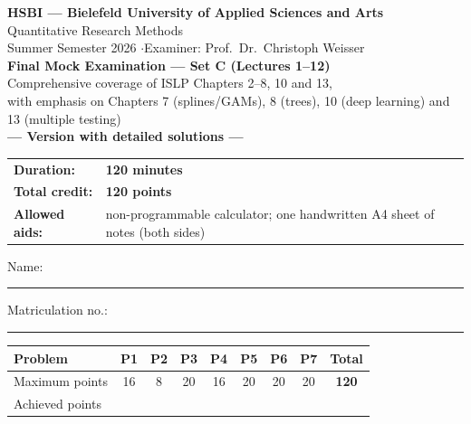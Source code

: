 \documentclass[11pt,a4paper]{article}
\begin{document}
\begin{center}
  {\Large\textbf{HSBI --- Bielefeld University of Applied Sciences and Arts}}\\[1.2mm]
  {\large Quantitative Research Methods}\\[1mm]
  {\normalsize Summer Semester 2026 \quad$\cdot$\quad Examiner: Prof.\ Dr.\ Christoph Weisser}\\[4.5mm]
  {\LARGE\textbf{Final Mock Examination --- Set C (Lectures 1--12)}}\\[1.2mm]
  {\normalsize Comprehensive coverage of ISLP Chapters 2--8, 10 and 13,\\
   with emphasis on Chapters 7 (splines/GAMs), 8 (trees), 10 (deep learning) and 13 (multiple testing)}%
  \ifdefined\withsolutions\\[2.2mm]{\large\textcolor{teal!55!black}{\textbf{--- Version with detailed solutions ---}}}\fi
\end{center}

\vspace{2.5mm}
\begin{center}
\begin{tabular}{@{}ll@{}}
  \textbf{Duration:} & \textbf{120 minutes}\\
  \textbf{Total credit:} & \textbf{120 points}\\
  \textbf{Allowed aids:} & non-programmable calculator; one handwritten A4 sheet of notes (both sides)\\
\end{tabular}
\end{center}

\vspace{3mm}
Name: \rule[-1mm]{0.38\textwidth}{0.4pt}\hfill Matriculation no.: \rule[-1mm]{0.24\textwidth}{0.4pt}

\vspace{4.5mm}
\begin{center}
\renewcommand{\arraystretch}{1.35}
\begin{tabular}{|l|c|c|c|c|c|c|c|c|}
\hline
\textbf{Problem} & \textbf{P1} & \textbf{P2} & \textbf{P3} & \textbf{P4} & \textbf{P5} & \textbf{P6} & \textbf{P7} & \textbf{Total}\\\hline
Maximum points & 16 & 8 & 20 & 16 & 20 & 20 & 20 & \textbf{120}\\\hline
Achieved points & \hspace{8mm} & \hspace{8mm} & \hspace{8mm} & \hspace{8mm} & \hspace{8mm} & \hspace{8mm} & \hspace{8mm} & \hspace{10mm}\\\hline
\end{tabular}
\end{center}
\end{document}
